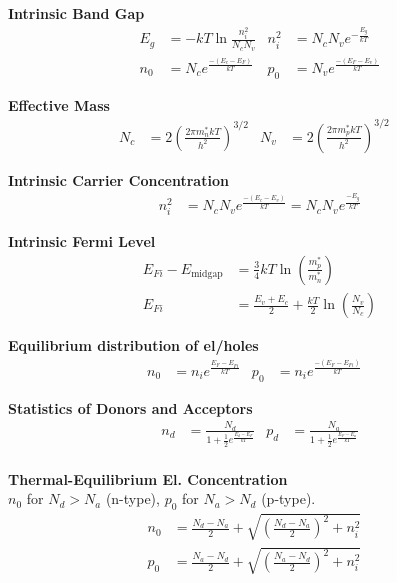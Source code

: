 \documentclass[a4paper, fontsize=8pt, landscape, DIV=1]{scrartcl}
\begin{document}
\begin{multicols*}{4}
    \textbf{Intrinsic Band Gap} \\
      \begin{align*}
        E_g &= -kT\ln\frac{n_i^2}{N_c N_v} &
        n_i^2 &= N_c N_v e^{-\frac{E_g}{kT}} \\
        n_0 &= N_ce^{\frac{-(E_c-E_F)}{kT}} &
        p_0 &= N_ve^{\frac{-(E_F-E_v)}{kT}}
      \end{align*}

    \textbf{Effective Mass} \\
      \begin{align*}
        N_c &= 2\left(\frac{2\pi m_n^*kT}{h^2}\right)^{3/2} &
        N_v &= 2\left(\frac{2\pi m_p^*kT}{h^2}\right)^{3/2} &
      \end{align*}

    \textbf{Intrinsic Carrier Concentration} \\
      \begin{align*}
        n_i^2 &= N_cN_ve^{\frac{-(E_c-E_v)}{kT}} = N_cN_ve^{\frac{-E_g}{kT}}
      \end{align*}

    \textbf{Intrinsic Fermi Level} \\
      \begin{align*}
        E_{Fi} - E_{\text{midgap}} &= \frac{3}{4}kT\ln\left(\frac{m_p^*}{m_n^*}\right) \\
        E_{Fi} &= \frac{E_v+E_c}{2} + \frac{kT}{2}\ln\left(\frac{N_v}{N_c}\right)
      \end{align*}

    \textbf{Equilibrium distribution of el/holes} \\
      \begin{align*}
        n_0 &= n_i e^{\frac{E_F-E_{Fi}}{kT}} &
        p_0 &= n_i e^{\frac{-(E_F-E_{Fi})}{kT}} &
      \end{align*}

    \textbf{Statistics of Donors and Acceptors} \\
      \begin{align*}
        n_d &= \frac{N_d}{1+\frac{1}{2}e^{\frac{E_d-E_F}{kT}}} &
        p_d &= \frac{N_a}{1+\frac{1}{2}e^{\frac{E_F-E_a}{kT}}} \\
      \end{align*}

    \textbf{Thermal-Equilibrium El. Concentration} \\
    $n_0$ for $N_d>N_a$ (n-type), $p_0$ for $N_a>N_d$ (p-type).
      \begin{align*}
        n_0 & = \frac{N_d-N_a}{2}+\sqrt{\left(\frac{N_d-N_a}{2}\right)^2+n_i^2} \\
        p_0 & = \frac{N_a-N_d}{2}+\sqrt{\left(\frac{N_a-N_d}{2}\right)^2+n_i^2} &
      \end{align*}
 

\end{multicols*}
\end{document}
